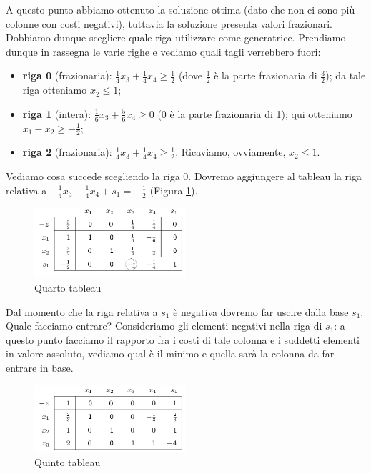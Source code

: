 \documentclass[11pt]{book}
\begin{document}
A questo punto abbiamo ottenuto la soluzione ottima (dato che non ci
sono pi\`u colonne con costi negativi), tuttavia la soluzione presenta
valori frazionari. Dobbiamo dunque scegliere quale riga utilizzare
come generatrice. Prendiamo dunque in rassegna le varie righe e
vediamo quali tagli verrebbero fuori:

\begin{itemize}
\item {\bf riga 0} (frazionaria): $\frac{1}{4}x_3 + \frac{1}{4}x_4
  \geq \frac{1}{2}$ (dove $\frac{1}{2}$ \`e la parte frazionaria di
  $\frac{3}{2}$); da tale riga otteniamo $x_2 \leq 1$;

\item {\bf riga 1} (intera): $\frac{1}{6}x_3 + \frac{5}{6}x_4 \geq 0$
  (0 \`e la parte frazionaria di 1); qui otteniamo $x_1-x_2 \geq
  -\frac{1}{2}$;

\item {\bf riga 2} (frazionaria): $\frac{1}{4}x_3 + \frac{1}{4}x_4
  \geq \frac{1}{2}$. Ricaviamo, ovviamente, $x_2 \leq 1$.
\end{itemize}

Vediamo cosa succede scegliendo la riga 0. Dovremo aggiungere al
tableau la riga relativa a $-\frac{1}{4}x_3 - \frac{1}{4}x_4 + s_1 =
-\frac{1}{2}$ (Figura \ref{cap6tab4}).

\begin{figure}[h!]
  \centering
  \includegraphics[width=0.5\textwidth]{images/cap6tab4.png}
  \caption{Quarto tableau}
  \label{cap6tab4}
\end{figure}

Dal momento che la riga relativa a $s_1$ \`e negativa dovremo far
uscire dalla base $s_1$. Quale facciamo entrare? Consideriamo gli
elementi negativi nella riga di $s_1$: a questo punto facciamo il
rapporto fra i costi di tale colonna e i suddetti elementi in valore
assoluto, vediamo qual \`e il minimo e quella sar\`a la colonna da far
entrare in base. 

\begin{figure}[h!]
  \centering
  \includegraphics[width=0.5\textwidth]{images/cap6tab5.png}
  \caption{Quinto tableau}
  \label{cap6tab5}
\end{figure}
\end{document}
